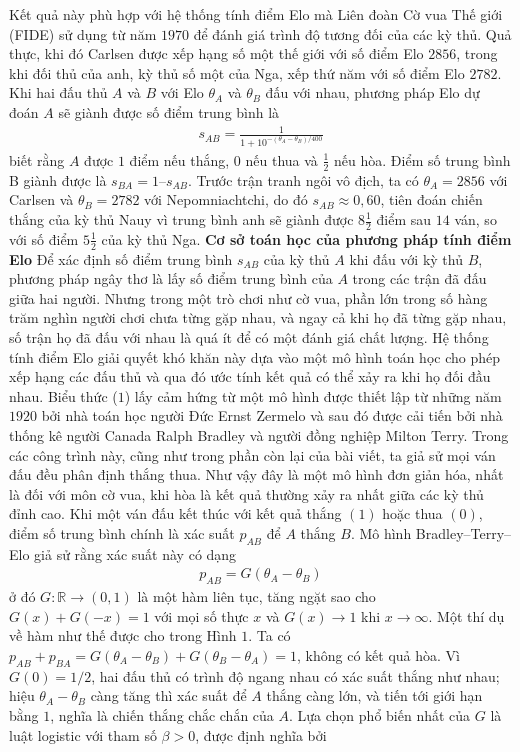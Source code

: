 \begin{multicols}{2}
	\vskip 0.05cm
	Kết quả này phù hợp với hệ thống tính điểm Elo mà Liên đoàn Cờ vua Thế giới (FIDE) sử dụng từ năm $1970$ để đánh giá trình độ tương đối của các kỳ thủ. Quả thực, khi đó Carlsen được xếp hạng số một thế giới với số điểm Elo $2856$, trong khi đối thủ của anh, kỳ thủ số một của Nga, xếp thứ năm với số điểm Elo $2782$.
	\vskip 0.05cm
	Khi hai đấu thủ $A$ và $B$ với Elo $\theta_A$ và $\theta_B$ đấu với nhau, phương pháp Elo dự đoán $A$ sẽ giành được số điểm trung bình là
	\setlength{\abovedisplayskip}{4pt}
	\setlength{\belowdisplayskip}{4pt}
	\begin{align*}
		s_{AB} = \frac{1}{1+ 10^{-(\theta_A - \theta_B) /400}} \tag{$1$}
	\end{align*}
	biết rằng $A$ được $1$ điểm nếu thắng, $0$ nếu thua và $\frac{1}{2}$ nếu hòa. Điểm số trung bình B giành được là $s_{BA} = 1 – s_{AB}$.
	\vskip 0.05cm
	Trước trận tranh ngôi vô địch, ta có $\theta_A = 2856$ với Carlsen và $\theta_B = 2782$ với Nepomniachtchi, do đó $s_{AB} \approx 0{,}60$, tiên đoán chiến thắng của kỳ thủ Nauy vì trung bình anh sẽ giành được $8\frac{1}{2}$ điểm sau $14$ ván, so với số điểm $5\frac{1}{2}$ của kỳ thủ Nga.
	\vskip 0.05cm
	\textbf{\color{toanhocdoisong}Cơ sở toán học của phương pháp tính điểm Elo}
	\vskip 0.05cm
	Để xác định số điểm trung bình $s_{AB}$ của kỳ thủ $A$ khi đấu với kỳ thủ $B$, phương pháp ngây thơ là lấy số điểm trung bình của $A$ trong các trận đã đấu giữa hai người. Nhưng trong một trò chơi như cờ vua, phần lớn trong số hàng trăm nghìn người chơi chưa từng gặp nhau, và ngay cả khi họ đã từng gặp nhau, số trận họ đã đấu với nhau là quá ít để có một đánh giá chất lượng. Hệ thống tính điểm Elo giải quyết khó khăn này dựa vào một mô hình toán học cho phép xếp hạng các đấu thủ và qua đó ước tính kết quả có thể xảy ra khi họ đối đầu nhau.
	\vskip 0.02cm
	Biểu thức ($1$) lấy cảm hứng từ một mô hình được thiết lập từ những năm $1920$ bởi nhà toán học người Đức Ernst Zermelo và sau đó được cải tiến bởi nhà thống kê người Canada Ralph Bradley và người đồng nghiệp Milton Terry. Trong các công trình này, cũng như trong phần còn lại của bài viết, ta giả sử mọi ván đấu đều phân định thắng thua. Như vậy đây là một mô hình đơn giản hóa, nhất là đối với môn cờ vua, khi hòa là kết quả thường xảy ra nhất giữa các kỳ thủ đỉnh cao.
	\vskip 0.02cm
	Khi một ván đấu kết thúc với kết quả thắng $(1)$ hoặc thua $(0)$, điểm số trung bình chính là xác suất $p_{AB}$ để $A$ thắng $B$. Mô hình Bradley--Terry--Elo giả sử rằng xác suất này có dạng
	\begin{align*}
		p_{AB} = G(\theta_A - \theta_B)\tag{$2$}
	\end{align*}
	ở đó $G: \mathbb R \rightarrow (0, 1)$ là một hàm liên tục, tăng ngặt sao cho $G(x) + G(-x) = 1$ với mọi số thực $x$ và $G(x) \rightarrow 1$ khi $x \rightarrow \infty$. Một thí dụ về hàm như thế được cho trong Hình $1$. Ta có $p_{AB} + p_{BA} = G(\theta_A - \theta_B) + G(\theta_B - \theta_A) = 1$, không có kết quả hòa. Vì $G(0) = 1/2$, hai đấu thủ có trình độ ngang nhau có xác suất thắng như nhau; hiệu $\theta_A - \theta_B$ càng tăng thì xác suất để $A$ thắng càng lớn, và tiến tới giới hạn bằng $1$, nghĩa là chiến thắng chắc chắn của $A$.
	Lựa chọn phổ biến nhất của $G$ là luật logistic với tham số $\beta > 0$, được định nghĩa bởi
	

\end{multicols}
